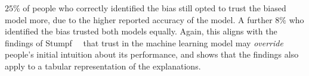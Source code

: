 $25\%$ of people who correctly identified the bias still opted to trust the biased model more, due to the higher reported accuracy of the model.
A further $8\%$ who identified the bias trusted both models equally.
Again, this aligns with the findings of Stumpf~\etal~\cite{harmful} that trust in the machine learning model may \emph{override} people's initial intuition about its performance, and shows that the findings also apply to a tabular representation of the explanations.

